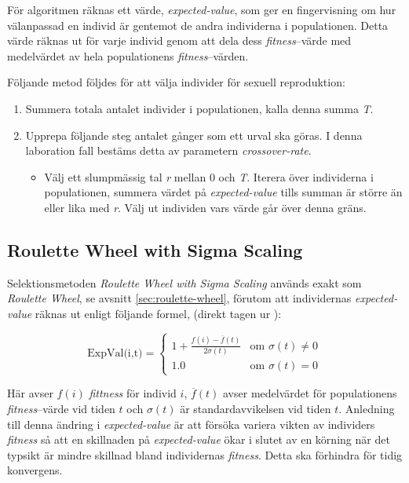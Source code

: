 \documentclass[titlepage, a4paper, 12pt]{article}
\begin{document}
För algoritmen räknas ett värde, \textit{expected-value}, som ger en
fingervisning om hur välanpassad en individ är gentemot de andra
individerna i populationen. Detta värde räknas ut för varje individ
genom att dela dess \textit{fitness}–värde med medelvärdet av hela
populationens \textit{fitness}–värden.

Följande metod följdes för att välja individer för sexuell
reproduktion:

\begin{enumerate}
\item Summera totala antalet individer i populationen, kalla denna
  summa \textit{T}.
\item Upprepa följande steg antalet gånger som ett urval ska göras. I
  denna laboration fall bestäms detta av parametern
  \textit{crossover-rate}.
  \begin{itemize}
  \item Välj ett slumpmässig tal \textit{r} mellan 0 och
    \textit{T}. Iterera över individerna i populationen, summera
    värdet på \textit{expected-value} tills summan är större än eller
    lika med \textit{r}. Välj ut individen vars värde går över denna gräns.
  \end{itemize}
\end{enumerate}

\subsection{Roulette Wheel with Sigma Scaling}
Selektionsmetoden \textit{Roulette Wheel with Sigma Scaling} används
exakt som \textit{Roulette Wheel}, se avsnitt
\ref{sec:roulette-wheel}, förutom att individernas
\textit{expected-value} räknas ut enligt följande formel, (direkt
tagen ur \cite{gen-intro}):

\begin{displaymath}
  \textrm{ExpVal(i,t)} = \left\{ \begin{array}{ll}
      1 + \frac{f(i) - \overline{f}(t)}{2\sigma(t)} & \textrm{om } \sigma(t) \neq 0 \\
      1.0 & \textrm{om } \sigma(t) = 0
    \end{array} \right.
\end{displaymath}
  
Här avser $f(i)$ \textit{fittness} för individ $i$, $\overline{f}(t)$
avser medelvärdet för populationens \textit{fitness}–värde vid tiden
$t$ och $\sigma(t)$ är standardavvikelsen vid tiden $t$. Anledning
till denna ändring i \textit{expected-value} är att försöka variera
vikten av individers \textit{fitness} så att en skillnaden på
\textit{expected-value} ökar i slutet av en körning när det typsikt är
mindre skillnad bland individernas \textit{fitness}. Detta ska
förhindra för tidig konvergens.
\end{document}

